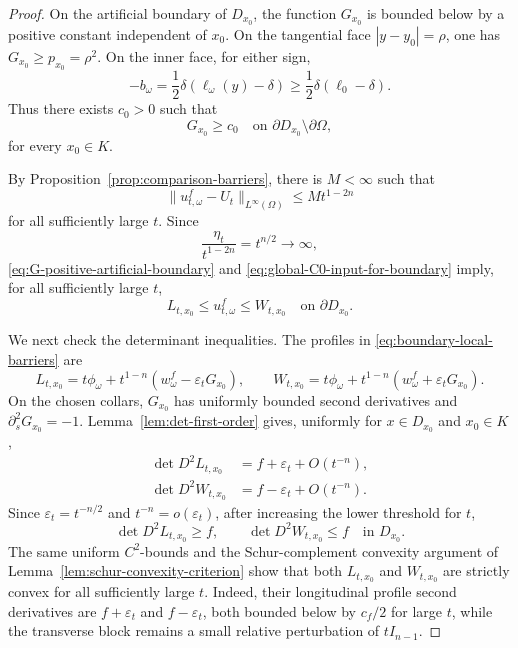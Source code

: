 \documentclass[11pt]{article}
\numberwithin{equation}{section}
\begin{document}
\begin{proof}
On the artificial boundary of \(D_{x_0}\), the function \(G_{x_0}\) is bounded below by a positive constant independent of \(x_0\).  On the tangential face \(|y-y_0|=\rho\), one has \(G_{x_0}\ge p_{x_0}=\rho^2\).  On the inner face, for either sign,
\[
    -b_\omega=\frac12\delta(\ell_\omega(y)-\delta)
    \ge \frac12\delta(\ell_0-\delta).
\]
Thus there exists \(c_0>0\) such that
\begin{equation}\label{eq:G-positive-artificial-boundary}
    G_{x_0}\ge c_0
    \quad\text{on }\partial D_{x_0}\setminus\partial\Omega,
\end{equation}
for every \(x_0\in K\).

By Proposition~\ref{prop:comparison-barriers}, there is \(M<\infty\) such that
\begin{equation}\label{eq:global-C0-input-for-boundary}
    \|u_{t,\omega}^f-U_t\|_{L^\infty(\Omega)}\le M t^{1-2n}
\end{equation}
for all sufficiently large \(t\).  Since
\[
    \frac{\eta_t}{t^{1-2n}}=t^{n/2}\to\infty,
\]
\eqref{eq:G-positive-artificial-boundary} and \eqref{eq:global-C0-input-for-boundary} imply, for all sufficiently large \(t\),
\[
    L_{t,x_0}\le u_{t,\omega}^f\le W_{t,x_0}
    \quad\text{on }\partial D_{x_0}.
\]

We next check the determinant inequalities.  The profiles in \eqref{eq:boundary-local-barriers} are
\[
    L_{t,x_0}
    =
    t\phi_\omega+t^{1-n}(w_\omega^f-\varepsilon_tG_{x_0}),
    \qquad
    W_{t,x_0}
    =
    t\phi_\omega+t^{1-n}(w_\omega^f+\varepsilon_tG_{x_0}).
\]
On the chosen collars, \(G_{x_0}\) has uniformly bounded second derivatives and \(\partial_s^2G_{x_0}=-1\).  Lemma~\ref{lem:det-first-order} gives, uniformly for \(x\in D_{x_0}\) and \(x_0\in K\),
\begin{equation}\label{eq:boundary-barrier-det-expansion}
\begin{aligned}
    \det D^2L_{t,x_0}&=f+\varepsilon_t+O(t^{-n}),\\
    \det D^2W_{t,x_0}&=f-\varepsilon_t+O(t^{-n}).
\end{aligned}
\end{equation}
Since \(\varepsilon_t=t^{-n/2}\) and \(t^{-n}=o(\varepsilon_t)\), after increasing the lower threshold for \(t\),
\begin{equation}\label{eq:boundary-barrier-det-inequalities}
    \det D^2L_{t,x_0}\ge f,
    \qquad
    \det D^2W_{t,x_0}\le f
    \quad\text{in }D_{x_0}.
\end{equation}
The same uniform \(C^2\)-bounds and the Schur-complement convexity argument of Lemma~\ref{lem:schur-convexity-criterion} show that both \(L_{t,x_0}\) and \(W_{t,x_0}\) are strictly convex for all sufficiently large \(t\).  Indeed, their longitudinal profile second derivatives are \(f+\varepsilon_t\) and \(f-\varepsilon_t\), both bounded below by \(c_f/2\) for large \(t\), while the transverse block remains a small relative perturbation of \(tI_{n-1}\).


\end{proof}
\end{document}
